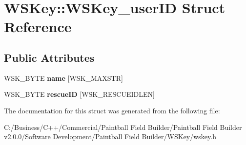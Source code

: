 \hypertarget{struct_w_s_key_1_1_w_s_key__user_i_d}{
\section{WSKey::WSKey\_\-userID Struct Reference}
\label{struct_w_s_key_1_1_w_s_key__user_i_d}
}
\subsection*{Public Attributes}
\begin{DoxyCompactItemize}
\item 
\hypertarget{struct_w_s_key_1_1_w_s_key__user_i_d_a30a7e6221a82dbab92e5efb50786b2f0}{
WSK\_\-BYTE {\bfseries name} \mbox{[}WSK\_\-MAXSTR\mbox{]}}
\label{struct_w_s_key_1_1_w_s_key__user_i_d_a30a7e6221a82dbab92e5efb50786b2f0}

\item 
\hypertarget{struct_w_s_key_1_1_w_s_key__user_i_d_a4412bfe0455e9df32ed064b76ac8044b}{
WSK\_\-BYTE {\bfseries rescueID} \mbox{[}WSK\_\-RESCUEIDLEN\mbox{]}}
\label{struct_w_s_key_1_1_w_s_key__user_i_d_a4412bfe0455e9df32ed064b76ac8044b}

\end{DoxyCompactItemize}


The documentation for this struct was generated from the following file:\begin{DoxyCompactItemize}
\item 
C:/Business/C++/Commercial/Paintball Field Builder/Paintball Field Builder v2.0.0/Software Development/Paintball Field Builder/WSKey/wskey.h\end{DoxyCompactItemize}
